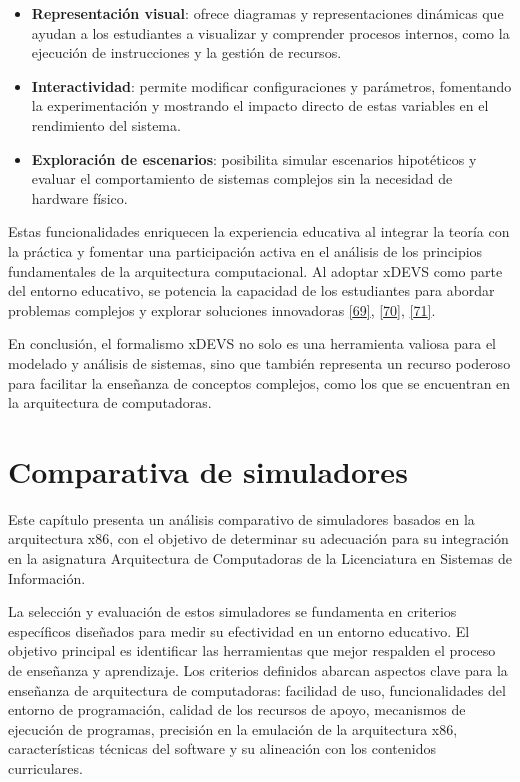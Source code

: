 \documentclass[12pt,oneside]{templates/unerthesis}
\providecommand{\tightlist}{%
  \setlength{\itemsep}{0pt}\setlength{\parskip}{0pt}}
\begin{document}
\begin{itemize}
\tightlist
\item
  \textbf{Representación visual}: ofrece diagramas y representaciones dinámicas que ayudan a los estudiantes a visualizar y comprender procesos internos, como la ejecución de instrucciones y la gestión de recursos.
\item
  \textbf{Interactividad}: permite modificar configuraciones y parámetros, fomentando la experimentación y mostrando el impacto directo de estas variables en el rendimiento del sistema.
\item
  \textbf{Exploración de escenarios}: posibilita simular escenarios hipotéticos y evaluar el comportamiento de sistemas complejos sin la necesidad de hardware físico.
\end{itemize}

Estas funcionalidades enriquecen la experiencia educativa al integrar la teoría con la práctica y fomentar una participación activa en el análisis de los principios fundamentales de la arquitectura computacional. Al adoptar xDEVS como parte del entorno educativo, se potencia la capacidad de los estudiantes para abordar problemas complejos y explorar soluciones innovadoras \protect\hyperlink{ref-calvo_valdes_simulador_2010}{{[}69{]}}, \protect\hyperlink{ref-Llorente2016xDEVS}{{[}70{]}}, \protect\hyperlink{ref-bryant2018verification}{{[}71{]}}.

En conclusión, el formalismo xDEVS no solo es una herramienta valiosa para el modelado y análisis de sistemas, sino que también representa un recurso poderoso para facilitar la enseñanza de conceptos complejos, como los que se encuentran en la arquitectura de computadoras.

\hypertarget{comparativa}{%
\chapter{Comparativa de simuladores}\label{comparativa}}

Este capítulo presenta un análisis comparativo de simuladores basados en la arquitectura x86, con el objetivo de determinar su adecuación para su integración en la asignatura Arquitectura de Computadoras de la Licenciatura en Sistemas de Información.

La selección y evaluación de estos simuladores se fundamenta en criterios específicos diseñados para medir su efectividad en un entorno educativo. El objetivo principal es identificar las herramientas que mejor respalden el proceso de enseñanza y aprendizaje. Los criterios definidos abarcan aspectos clave para la enseñanza de arquitectura de computadoras: facilidad de uso, funcionalidades del entorno de programación, calidad de los recursos de apoyo, mecanismos de ejecución de programas, precisión en la emulación de la arquitectura x86, características técnicas del software y su alineación con los contenidos curriculares.
\end{document}
